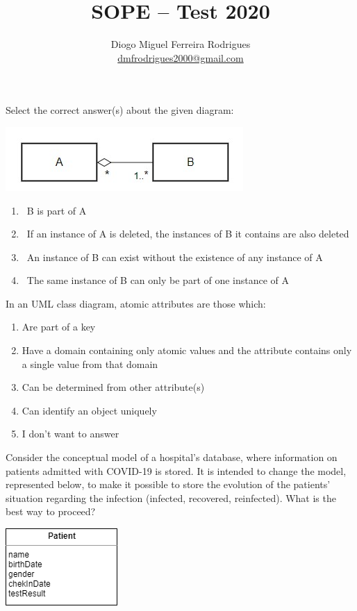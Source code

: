 \documentclass{bdad}
\title{SOPE -- Test 2020}
\author{Diogo Miguel Ferreira Rodrigues \\ \href{mailto:dmfrodrigues2000@gmail.com}{dmfrodrigues2000@gmail.com}}
\begin{document}
\renewcommand{\theenumi}{\alph{enumi}}


Select the correct answer(s) about the given diagram:

\begin{center}
    \includegraphics[scale=0.8]{2020T-01.jpg}
\end{center}

\begin{enumerate}
    \item \checkbox~B is part of A
    \item \checkbox~If an instance of A is deleted, the instances of B it contains are also deleted
    \item \checkbox~An instance of B can exist without the existence of any instance of A
    \item \checkbox~The same instance of B can only be part of one instance of A
\end{enumerate}

In an UML class diagram, atomic attributes are those which:

\begin{enumerate}
    \item Are part of a key
    \item Have a domain containing only atomic values and the attribute contains only a single value from that domain
    \item Can be determined from other attribute(s)
    \item Can identify an object uniquely
    \item I don't want to answer
\end{enumerate}

\newpage
{}
Consider the conceptual model of a hospital's database, where information on patients admitted with COVID-19 is stored. It is intended to change the model, represented below, to make it possible to store the evolution of the patients' situation regarding the infection (infected, recovered, reinfected). What is the best way to proceed?

\begin{center}
    \includegraphics[scale=0.8]{2020T-03.png}
\end{center}
\end{document}
